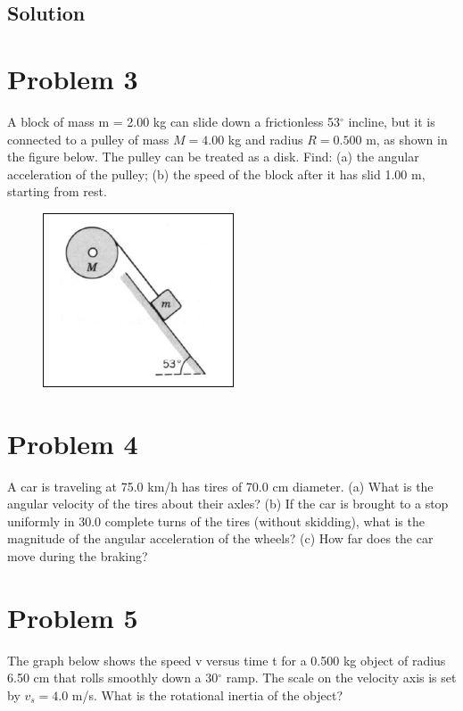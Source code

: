 \documentclass{article}
\begin{document}
\subsection*{Solution}


\section*{Problem 3}
A block of mass m = 2.00 kg can slide down a frictionless 53$^\circ$ incline, but it is connected to a pulley
of mass $M = 4.00$ kg and radius $R = 0.500$ m, as shown in the figure below. The pulley can be treated as
a disk. Find: (a) the angular acceleration of the pulley; (b) the speed of the block after it has slid 1.00 m,
starting from rest.

\begin{figure}[ht]
    \centering
    \includegraphics[scale=0.6]{drawing-1.png}
\end{figure}

\section*{Problem 4}
A car is traveling at 75.0 km/h has tires of 70.0 cm diameter. (a) What is the angular velocity of the tires about
their axles? (b) If the car is brought to a stop uniformly in 30.0 complete turns of the tires (without skidding),
what is the magnitude of the angular acceleration of the wheels? (c) How far does the car move during the
braking?

\section*{Problem 5}
The graph below shows the speed v versus time t for a 0.500 kg object of radius 6.50 cm that rolls smoothly
down a 30$^\circ$ ramp. The scale on the velocity axis is set by $v_s = 4.0$ m/s. What is the rotational inertia of the object?
\end{document}
